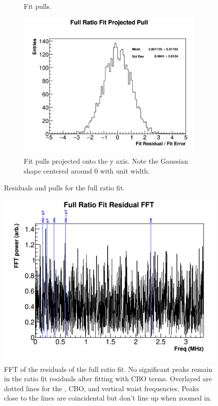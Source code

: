 \begin{figure}[h]
\begin{subfigure}[]{0.45\textwidth}
		    \caption{Fit pulls.}
	    \end{subfigure}%
	    \vspace{4mm}
	    \begin{subfigure}[]{0.7\textwidth}
		    \centering
			\includegraphics[width=\textwidth]{fitPull_projected}
		    \caption{Fit pulls projected onto the y axis. Note the Gaussian shape centered around 0 with unit width.}
	    \end{subfigure}
	\caption[fitResidual]{Residuals and pulls for the full ratio fit.}
	\label{fig:fitResidual}
	\end{figure}

	\begin{figure}[]
		\centering
		\includegraphics[width=\textwidth]{FFT_ratioCBOFit}
	    \caption[FFT_ratioCBOFit]{FFT of the residuals of the full ratio fit. No significant peaks remain in the ratio fit residuals after fitting with CBO terms. Overlayed are dotted lines for the \gmtwo, CBO, and vertical waist frequencies. Peaks close to the lines are coincidental but don't line up when zoomed in.}
	    \label{fig:FFT_ratioCBOFit}
	\end{figure}


